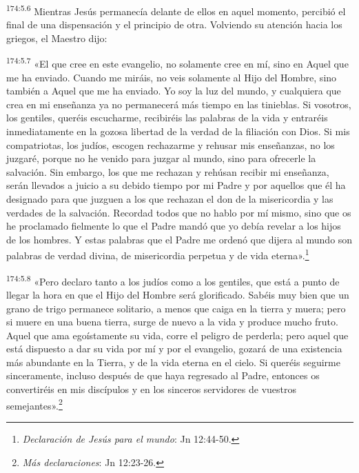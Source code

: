 \par
\textsuperscript{174:5.6} Mientras Jesús permanecía delante de ellos en aquel momento, percibió el final de una dispensación y el principio de otra. Volviendo su atención hacia los griegos, el Maestro dijo:

\par
\textsuperscript{174:5.7} «El que cree en este evangelio, no solamente cree en mí, sino en Aquel que me ha enviado. Cuando me miráis, no veis solamente al Hijo del Hombre, sino también a Aquel que me ha enviado. Yo soy la luz del mundo, y cualquiera que crea en mi enseñanza ya no permanecerá más tiempo en las tinieblas. Si vosotros, los gentiles, queréis escucharme, recibiréis las palabras de la vida y entraréis inmediatamente en la gozosa libertad de la verdad de la filiación con Dios. Si mis compatriotas, los judíos, escogen rechazarme y rehusar mis enseñanzas, no los juzgaré, porque no he venido para juzgar al mundo, sino para ofrecerle la salvación. Sin embargo, los que me rechazan y rehúsan recibir mi enseñanza, serán llevados a juicio a su debido tiempo por mi Padre y por aquellos que él ha designado para que juzguen a los que rechazan el don de la misericordia y las verdades de la salvación. Recordad todos que no hablo por mí mismo, sino que os he proclamado fielmente lo que el Padre mandó que yo debía revelar a los hijos de los hombres. Y estas palabras que el Padre me ordenó que dijera al mundo son palabras de verdad divina, de misericordia perpetua y de vida eterna».\footnote{\textit{Declaración de Jesús para el mundo}: Jn 12:44-50.}

\par
\textsuperscript{174:5.8} «Pero declaro tanto a los judíos como a los gentiles, que está a punto de llegar la hora en que el Hijo del Hombre será glorificado. Sabéis muy bien que un grano de trigo permanece solitario, a menos que caiga en la tierra y muera; pero si muere en una buena tierra, surge de nuevo a la vida y produce mucho fruto. Aquel que ama egoístamente su vida, corre el peligro de perderla; pero aquel que está dispuesto a dar su vida por mí y por el evangelio, gozará de una existencia más abundante en la Tierra, y de la vida eterna en el cielo. Si queréis seguirme sinceramente, incluso después de que haya regresado al Padre, entonces os convertiréis en mis discípulos y en los sinceros servidores de vuestros semejantes».\footnote{\textit{Más declaraciones}: Jn 12:23-26.}

